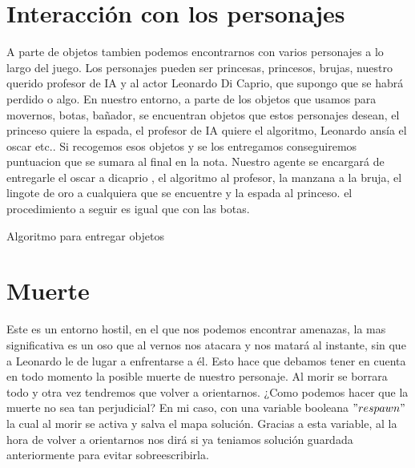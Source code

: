 \documentclass[10pt,a4paper,spanish]{article}
\begin{document}
\section{Interacción con los personajes}

A parte de objetos tambien podemos encontrarnos con varios personajes a lo largo del juego. Los personajes pueden ser princesas, princesos, brujas, nuestro querido profesor de IA y al actor Leonardo Di Caprio, que supongo que se habrá perdido o algo. En nuestro entorno, a parte de los objetos que usamos para movernos, botas, bañador, se encuentran objetos que estos personajes desean, el princeso quiere la espada, el profesor de IA quiere el algoritmo, Leonardo ansía el oscar etc.. Si recogemos esos objetos y se los entregamos conseguiremos puntuacion que se sumara al final en la nota. Nuestro agente se encargará de entregarle el oscar a dicaprio , el algoritmo al profesor, la manzana a la bruja, el lingote de oro a cualquiera que se encuentre y la espada al princeso. el procedimiento a seguir es igual que con las botas.

\begin{algorithm}[H]
\SetAlgoLined

\caption{Algoritmo para entregar objetos}
\end{algorithm}

\section{Muerte}

Este es un entorno hostil, en el que nos podemos encontrar amenazas, la mas significativa es un oso que al vernos nos atacara y nos matará al instante, sin que a Leonardo le de lugar a enfrentarse a él.
Esto hace que debamos tener en cuenta en todo momento la posible muerte de nuestro personaje. Al morir se borrara todo y otra vez tendremos que volver a orientarnos. ¿Como podemos hacer que la muerte no sea tan perjudicial?
En mi caso, con una variable booleana $"respawn"$ la cual al morir se activa y salva el mapa solución. Gracias a esta variable, al la hora de volver a orientarnos nos dirá si ya teniamos solución guardada anteriormente para evitar sobreescribirla.

\newpage

\ClearShipoutPicture
\end{document}
